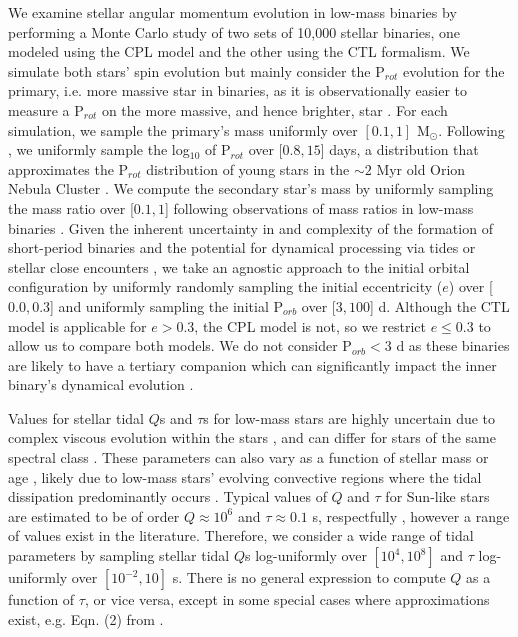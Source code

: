 \documentclass[twocolumn]{aastex61}
\begin{document}
We examine stellar angular momentum evolution in low-mass binaries by performing a Monte Carlo study of two sets of 10,000 stellar binaries, one modeled using the CPL model and the other using the CTL formalism.  We simulate both stars' spin evolution but mainly consider the P$_{rot}$ evolution for the primary, i.e. more massive star in binaries, as it is observationally easier to measure a P$_{rot}$ on the more massive, and hence brighter, star \citep[e.g.][]{Meibom2006,Lurie2017}. For each simulation, we sample the primary's mass uniformly over $[0.1, 1]$ M$_{\odot}$. Following \citet{Matt2015}, we uniformly sample the log$_{10}$ of P$_{rot}$ over [$0.8,15$] days, a distribution that approximates the P$_{rot}$ distribution of young stars in the ${\sim}2$ Myr old Orion Nebula Cluster \citep{Stassun1999,Herbst2001,Herbst2002,Rodriguez-Ledesma2009}.  We compute the secondary star's mass by uniformly sampling the mass ratio over [$0.1, 1$] following observations of mass ratios in low-mass binaries \citep{Raghavan2010,Moe2018}. Given the inherent uncertainty in and complexity of the formation of short-period binaries \citep[e.g.][]{Bonnell1994,Bate2000,Bate2002,Moe2018} and the potential for dynamical processing via tides or stellar close encounters \citep[e.g.][]{Mardling2001,Hurley2002,Ivanova2005,Meibom2005}, we take an agnostic approach to the initial orbital configuration by uniformly randomly sampling the initial eccentricity ($e$) over [$0.0,0.3$] and uniformly sampling the initial P$_{orb}$ over [$3,100$] d. Although the CTL model is applicable for $e > 0.3$, the CPL model is not, so we restrict $e \leq 0.3$ to allow us to compare both models. We do not consider P$_{orb} < 3$ d as these binaries are likely to have a tertiary companion \citep{Tokovinin2006} which can significantly impact the inner binary's dynamical evolution \citep[e.g.][]{Munoz2015,Martin2015b,Hamers2016,Moe2018}. 

Values for stellar tidal $Q$s and $\tau$s for low-mass stars are highly uncertain due to complex viscous evolution within the stars \citep{Ogilvie2007}, and can differ for stars of the same spectral class \citep{Barker2009}. These parameters can also vary as a function of stellar mass or age \citep{Bolmont2016,vanEylen2016}, likely due to low-mass stars' evolving convective regions where the tidal dissipation predominantly occurs \citep{Zahn2008}. Typical values of $Q$ and $\tau$ for Sun-like stars are estimated to be of order $Q \approx 10^6$ and $\tau \approx 0.1$ s, respectfully \citep[e.g.][]{Meibom2005,Ogilvie2007,Jackson2008}, however a range of values exist in the literature.  Therefore, we consider a wide range of tidal parameters by sampling stellar tidal $Q$s log-uniformly over $[10^4,10^8]$ and $\tau$ log-uniformly over $[10^{-2},10]$ s.  There is no general expression to compute $Q$ as a function of $\tau$, or vice versa, except in some special cases where approximations exist, e.g. Eqn. (2) from \citet{Heller2011}. 
\end{document}
